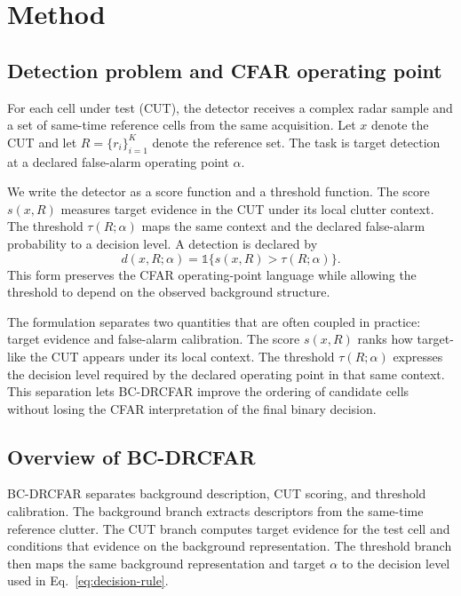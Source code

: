 \documentclass[preprint,12pt]{elsarticle}
\begin{document}
\section{Method}
\label{sec:method}

\subsection{Detection problem and CFAR operating point}
\label{subsec:problem}

For each cell under test (CUT), the detector receives a complex radar sample and
a set of same-time reference cells from the same acquisition. Let $x$ denote the
CUT and let $R=\{r_i\}_{i=1}^{K}$ denote the reference set. The task is target
detection at a declared false-alarm operating point $\alpha$.

We write the detector as a score function and a threshold function. The score
$s(x,R)$ measures target evidence in the CUT under its local clutter context.
The threshold $\tau(R;\alpha)$ maps the same context and the declared
false-alarm probability to a decision level. A detection is declared by
\begin{equation}
  d(x,R;\alpha) = \mathbb{1}\{s(x,R) > \tau(R;\alpha)\}.
  \label{eq:decision-rule}
\end{equation}
This form preserves the CFAR operating-point language while allowing the
threshold to depend on the observed background structure.

The formulation separates two quantities that are often coupled in practice:
target evidence and false-alarm calibration. The score $s(x,R)$ ranks how
target-like the CUT appears under its local context. The threshold
$\tau(R;\alpha)$ expresses the decision level required by the declared
operating point in that same context. This separation lets BC-DRCFAR improve the
ordering of candidate cells without losing the CFAR interpretation of the final
binary decision.

\subsection{Overview of BC-DRCFAR}
\label{subsec:overview}

BC-DRCFAR separates background description, CUT scoring, and threshold
calibration. The background branch extracts descriptors from the same-time
reference clutter. The CUT branch computes target evidence for the test cell and
conditions that evidence on the background representation. The threshold branch
then maps the same background representation and target $\alpha$ to the decision
level used in Eq.~\eqref{eq:decision-rule}.
\end{document}
